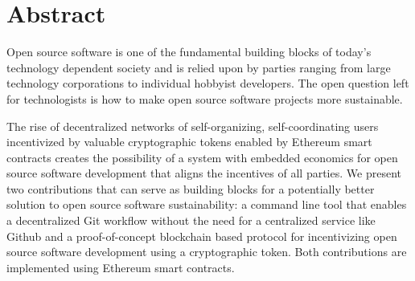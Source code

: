 \section*{Abstract}

Open source software is one of the fundamental building blocks of today's
technology dependent society and is relied upon by parties ranging from large technology corporations
to individual hobbyist developers. The open question left for technologists is
how to make open source software projects more sustainable.

The rise of decentralized networks of self-organizing, self-coordinating users
incentivized by valuable cryptographic tokens enabled by Ethereum smart
contracts creates the possibility of a system with embedded economics for open
source software development that aligns the incentives of all parties. We
present two contributions that can serve as building blocks for a potentially better
solution to open source software sustainability: a command line tool that
enables a decentralized Git workflow without the need for a centralized service
like Github and a proof-of-concept blockchain based protocol for incentivizing
open source software development using a cryptographic token. Both contributions
are implemented using Ethereum smart contracts.
